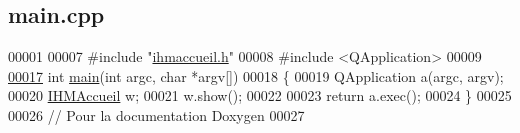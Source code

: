 \hypertarget{main_8cpp_source}{}\subsection{main.\+cpp}
\label{main_8cpp_source}

\begin{DoxyCode}
00001 
00007 \textcolor{preprocessor}{#include "\hyperlink{ihmaccueil_8h}{ihmaccueil.h}"}
00008 \textcolor{preprocessor}{#include <QApplication>}
00009 
\hyperlink{main_8cpp_a0ddf1224851353fc92bfbff6f499fa97}{00017} \textcolor{keywordtype}{int} \hyperlink{main_8cpp_a0ddf1224851353fc92bfbff6f499fa97}{main}(\textcolor{keywordtype}{int} argc, \textcolor{keywordtype}{char} *argv[])
00018 \{
00019     QApplication a(argc, argv);
00020     \hyperlink{class_i_h_m_accueil}{IHMAccueil} w;
00021     w.show();
00022 
00023     \textcolor{keywordflow}{return} a.exec();
00024 \}
00025 
00026 \textcolor{comment}{// Pour la documentation Doxygen}
00027 
\end{DoxyCode}
